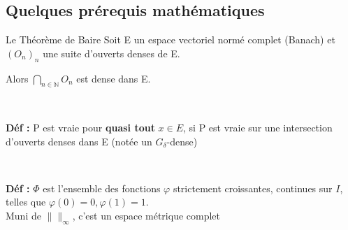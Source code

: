 \documentclass[8pt,a9paper]{beamer} \usepackage[utf8]{inputenc} \usepackage[francais]{babel} \usepackage[T1]{fontenc}
\begin{document}
\subsection{Quelques prérequis mathématiques}
\begin{frame}
	\begin{block}{Le Théorème de Baire}
	Soit E un espace vectoriel normé complet (Banach) et $(O_n)_n$ une suite d'ouverts denses de E.
	\begin{center}
	Alors $\bigcap_{n \in\mathbb{N}} O_n$ est dense dans E.
	\end{center}
	\end{block}
	\textbf{\\}
	\begin{exampleblock}{}
	\textbf{Déf : }P est vraie pour \textbf{quasi tout} $x \in E$, si P est vraie sur une intersection d'ouverts denses dans E (notée un $G_\delta$-dense)
	\end{exampleblock}
	\textbf{\\}
	\begin{exampleblock}{}
	\textbf{Déf : }$\Phi$ est l'ensemble des fonctions $\varphi$ strictement croissantes, continues sur $I$, telles que $\varphi(0)=0 , \varphi(1)=1$.\\
	Muni de $\|\|_\infty$, c'est un espace métrique complet
	\end{exampleblock}
\end{frame}
\end{document}

